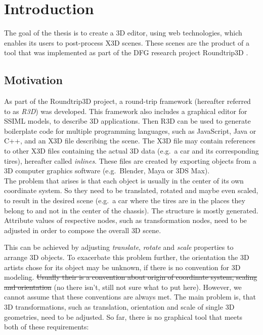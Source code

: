 
\section{Introduction}
\label{sec:Prelude}

The goal of the thesis is to create a \gls{3D} editor, using web technologies,
which enables its users to post-process \gls{X3D} scenes. These scenes are the
product of a tool that was implemented as part of the DFG research
project \gls{Roundtrip3D} \cite{Jung:2015:SDA:2802768.2802837}.
\subsection{Motivation}\label{motivation}

As part of the Roundtrip3D project, a round-trip framework (hereafter
referred to as \emph{R3D}) was developed. This framework also includes a
graphical editor for SSIML models, to describe \gls{3D} applications. Then
\gls{R3D} can be used to generate boilerplate code for multiple programming
languages, such as JavaScript, Java or C++, and an \gls{X3D} file describing
the scene. The \gls{X3D} file may contain references to other \gls{X3D} files
containing the actual \gls{3D} data (e.g.~a car and its corresponding tires),
hereafter called \emph{inlines}. These files are created by exporting
objects from a \gls{3D} computer graphics software (e.g.~Blender,
Maya or 3DS Max).\\
The problem that arises is that each object is usually in the center of
its own coordinate system. So they need to be translated, rotated and
maybe even scaled, to result in the desired scene (e.g.~a car where the tires
are in the places they belong to and not in the center of the chassis).
The structure is mostly generated. Attribute values of respective nodes,
such as transformation nodes, need to be adjusted in order to compose the
overall \gls{3D} scene.


This can be achieved by adjusting \emph{translate}, \emph{rotate} and
\emph{scale} properties to arrange \gls{3D} objects. To exacerbate this problem
further, the orientation the \gls{3D} artists chose for its object may be unknown, if
there is no convention for \gls{3D} modeling. \sout{Usually their is a convention
about origin of coordinate system, scaling and orientation} (no there isn't, still
not sure what to put here). However, we cannot assume that these conventions are
always met. The main problem is, that \gls{3D} transformations, such as translation,
orientation and scale of single \gls{3D} geometries, need to be adjusted. So far,
there is no graphical tool that meets both of these requirements:

